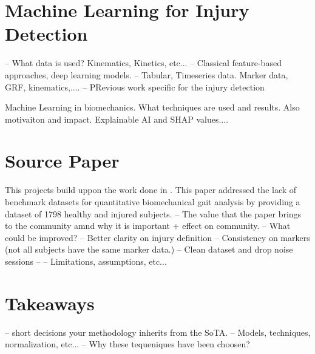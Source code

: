 \section{Machine Learning for Injury Detection}\label{sec:sota-ml-injury-detection}
-- What data is used? Kinematics, Kinetics, etc...
-- Classical feature-based approaches, deep learning models.
-- Tabular, Timeseries data. Marker data, GRF, kinematics,....
-- PRevious work specific for the injury detection

\cite{Harris2022} Machine Learning in biomechanics. What techniques are used and results. Also motivaiton and impact.
\cite{Dibbern2025} Explainable AI and SHAP values....

\section{Source Paper}\label{sec:sota-source-paper}
This projects build uppon the work done in \citet{Ferber2024}. This paper addressed the lack of benchmark datasets for quantitative biomechanical gait analysis by providing a dataset of 1798 healthy and injured subjects.
-- The value that the paper brings to the community amnd why it is important + effect on community.
-- What could be improved?
-- Better clarity on injury definition
-- Consistency on markers (not all subjects have the same marker data.)
-- Clean dataset and drop noise sessions
-- 
-- Limitations, assumptions, etc...

\section{Takeaways}\label{sec:sota-methodological-takeaways}
-- short decisions your methodology inherits from the SoTA.
-- Models, techniques, normalization, etc...
-- Why these tequeniques have been choosen?
